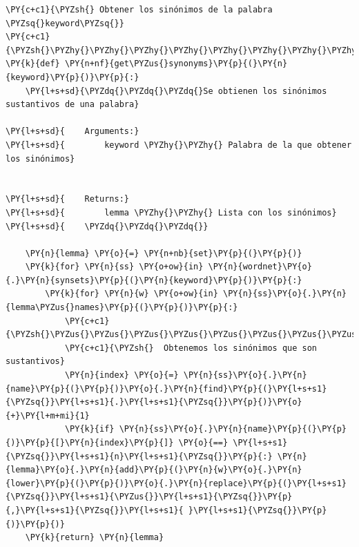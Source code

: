     \begin{tcolorbox}[breakable, size=fbox, boxrule=1pt, pad at break*=1mm,colback=cellbackground, colframe=cellborder]
\begin{Verbatim}[commandchars=\\\{\}]
\PY{c+c1}{\PYZsh{} Obtener los sinónimos de la palabra \PYZsq{}keyword\PYZsq{}}
\PY{c+c1}{\PYZsh{}\PYZhy{}\PYZhy{}\PYZhy{}\PYZhy{}\PYZhy{}\PYZhy{}\PYZhy{}\PYZhy{}\PYZhy{}\PYZhy{}\PYZhy{}\PYZhy{}\PYZhy{}\PYZhy{}\PYZhy{}\PYZhy{}\PYZhy{}\PYZhy{}\PYZhy{}\PYZhy{}\PYZhy{}\PYZhy{}\PYZhy{}\PYZhy{}\PYZhy{}\PYZhy{}\PYZhy{}\PYZhy{}\PYZhy{}\PYZhy{}\PYZhy{}\PYZhy{}\PYZhy{}\PYZhy{}\PYZhy{}\PYZhy{}\PYZhy{}\PYZhy{}\PYZhy{}\PYZhy{}\PYZhy{}\PYZhy{}\PYZhy{}\PYZhy{}\PYZhy{}\PYZhy{}\PYZhy{}\PYZhy{}\PYZhy{}\PYZhy{}\PYZhy{}\PYZhy{}\PYZhy{}\PYZhy{}\PYZhy{}\PYZhy{}\PYZhy{}\PYZhy{}\PYZhy{}\PYZhy{}\PYZhy{}\PYZhy{}}
\PY{k}{def} \PY{n+nf}{get\PYZus{}synonyms}\PY{p}{(}\PY{n}{keyword}\PY{p}{)}\PY{p}{:}
    \PY{l+s+sd}{\PYZdq{}\PYZdq{}\PYZdq{}Se obtienen los sinónimos sustantivos de una palabra}

\PY{l+s+sd}{    Arguments:}
\PY{l+s+sd}{        keyword \PYZhy{}\PYZhy{} Palabra de la que obtener los sinónimos}


\PY{l+s+sd}{    Returns:}
\PY{l+s+sd}{        lemma \PYZhy{}\PYZhy{} Lista con los sinónimos}
\PY{l+s+sd}{    \PYZdq{}\PYZdq{}\PYZdq{}}

    \PY{n}{lemma} \PY{o}{=} \PY{n+nb}{set}\PY{p}{(}\PY{p}{)}
    \PY{k}{for} \PY{n}{ss} \PY{o+ow}{in} \PY{n}{wordnet}\PY{o}{.}\PY{n}{synsets}\PY{p}{(}\PY{n}{keyword}\PY{p}{)}\PY{p}{:}
        \PY{k}{for} \PY{n}{w} \PY{o+ow}{in} \PY{n}{ss}\PY{o}{.}\PY{n}{lemma\PYZus{}names}\PY{p}{(}\PY{p}{)}\PY{p}{:}
            \PY{c+c1}{\PYZsh{}\PYZus{}\PYZus{}\PYZus{}\PYZus{}\PYZus{}\PYZus{}\PYZus{}\PYZus{}\PYZus{}\PYZus{}\PYZus{}\PYZus{}\PYZus{}\PYZus{}\PYZus{}\PYZus{}\PYZus{}\PYZus{}\PYZus{}\PYZus{}\PYZus{}\PYZus{}\PYZus{}\PYZus{}\PYZus{}\PYZus{}\PYZus{}\PYZus{}\PYZus{}\PYZus{}\PYZus{}}
            \PY{c+c1}{\PYZsh{}  Obtenemos los sinónimos que son sustantivos}
            \PY{n}{index} \PY{o}{=} \PY{n}{ss}\PY{o}{.}\PY{n}{name}\PY{p}{(}\PY{p}{)}\PY{o}{.}\PY{n}{find}\PY{p}{(}\PY{l+s+s1}{\PYZsq{}}\PY{l+s+s1}{.}\PY{l+s+s1}{\PYZsq{}}\PY{p}{)}\PY{o}{+}\PY{l+m+mi}{1}
            \PY{k}{if} \PY{n}{ss}\PY{o}{.}\PY{n}{name}\PY{p}{(}\PY{p}{)}\PY{p}{[}\PY{n}{index}\PY{p}{]} \PY{o}{==} \PY{l+s+s1}{\PYZsq{}}\PY{l+s+s1}{n}\PY{l+s+s1}{\PYZsq{}}\PY{p}{:} \PY{n}{lemma}\PY{o}{.}\PY{n}{add}\PY{p}{(}\PY{n}{w}\PY{o}{.}\PY{n}{lower}\PY{p}{(}\PY{p}{)}\PY{o}{.}\PY{n}{replace}\PY{p}{(}\PY{l+s+s1}{\PYZsq{}}\PY{l+s+s1}{\PYZus{}}\PY{l+s+s1}{\PYZsq{}}\PY{p}{,}\PY{l+s+s1}{\PYZsq{}}\PY{l+s+s1}{ }\PY{l+s+s1}{\PYZsq{}}\PY{p}{)}\PY{p}{)}
    \PY{k}{return} \PY{n}{lemma}   
\end{Verbatim}
\end{tcolorbox}


